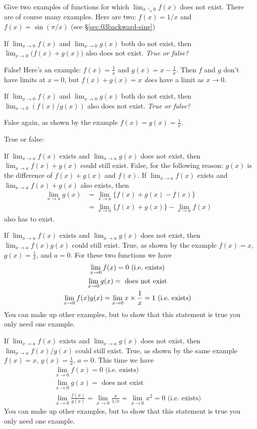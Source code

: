 \problem Give two examples of functions for which $\lim_{x\searrow 0} 
f(x)$ does not exist.
\answer 
There are of course many examples.  Here are two: $f(x) = 1/x$ and
$f(x) = \sin(\pi/x)$ (see \S\ref{sec:03backward-sine})
\endanswer

\problem \groupproblem If $\lim_{x\to 0}f(x)$ and $\lim_{x\to0}g(x)$ both do not 
exist, then $\lim_{x\to 0}\bigl(f(x) + g(x)\bigr)$ also does not exist.
\textit{True or false?}

\answer 
False!  Here's an example: $f(x) = \frac1x$ and $g(x) = x-\frac1x$.
Then $f$ and $g$ don't have limits at $x=0$, but $f(x) + g(x) = x$
\textit{does} have a limit as $x\to0$.
\endanswer

\problem \groupproblem If $\lim_{x\to 0}f(x)$ and $\lim_{x\to0}g(x)$ both do not 
exist, then $\lim_{x\to 0}(f(x)/g(x))$ also does not exist.  \textit{True or false?}

\answer 
False again, as shown by the example $f(x) = g(x) = \frac1x$.
\endanswer

\problem True or false: 

\subprob If $\lim_{x\to a} f(x)$ exists and $\lim_{x\to a} g(x)$ does
not exist, then $\lim_{x\to a} f(x) + g(x)$ could still exist.
\answer 
False, for the following reason:  $g(x)$ is the difference of $f(x)+g(x)$ and
$f(x)$.  If $\lim_{x\to a} f(x)$ exists and $\lim_{x\to a} f(x) + g(x)$ also exists, then
\begin{align*}
  \lim_{x\to a} g(x) &= \lim_{x\to a} \bigl\{f(x) + g(x) - f(x)\bigr\}\\
  &= \lim_{x\to a} \bigl\{f(x) + g(x)\bigr\} - \lim_{x\to a} f(x)
\end{align*}
also has to exist.
\endanswer

\subprob If $\lim_{x\to a} f(x)$ exists and $\lim_{x\to a} g(x)$ does
not exist, then $\lim_{x\to a} f(x) g(x)$ could still exist.
\answer 
True, as shown by the example $f(x) = x$, $g(x) = \frac{1}{x}$, and $a=0$.
For these two functions we have
\begin{gather*}
  \lim_{x\to 0} f(x) = 0 \text{ (i.e.\ exists) } \\
  \lim_{x\to 0} g(x) = \text{ does not exist } \\
  \lim_{x\to 0} f(x) g(x) = \lim_{x\to 0} x\times\frac1x = 1 \text{ (i.e.\
  exists) }
\end{gather*}
You can make up other examples, but to show that this statement is true you only
need one example.
\endanswer

\subprob If $\lim_{x\to a} f(x)$ exists and $\lim_{x\to a} g(x)$ does
not exist, then $\lim_{x\to a} f(x)/g(x)$ could still exist.
\answer 
True, as shown by the same example $f(x) = x$, $g(x) = \frac{1}{x}$, $a=0$.
This time we have
\begin{gather*}
  \lim_{x\to 0} f(x) = 0 \text{ (i.e.\ exists) } \\
  \lim_{x\to 0} g(x) = \text{ does not exist } \\
  \lim_{x\to 0} \frac{f(x)}{g(x)} = \lim_{x\to 0} \frac{x}{1/x} =\lim_{x\to0}
  x^2 = 0 \text{ (i.e.\ exists) }
\end{gather*}
You can make up other examples, but to show that this statement is true you only
need one example.
\endanswer

